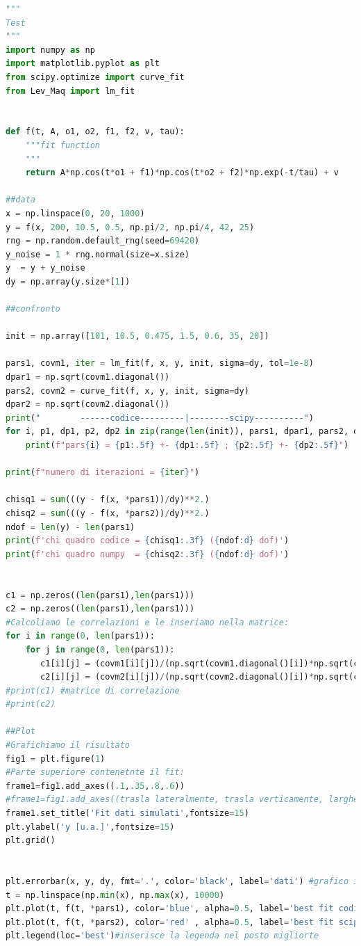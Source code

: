 \documentclass[10pt,a4paper]{article}
\begin{document}
\begin{lstlisting}[language=Python]
"""
Test
"""
import numpy as np
import matplotlib.pyplot as plt
from scipy.optimize import curve_fit
from Lev_Maq import lm_fit


def f(t, A, o1, o2, f1, f2, v, tau):
    """fit function
    """
    return A*np.cos(t*o1 + f1)*np.cos(t*o2 + f2)*np.exp(-t/tau) + v

##data
x = np.linspace(0, 20, 1000)
y = f(x, 200, 10.5, 0.5, np.pi/2, np.pi/4, 42, 25)
rng = np.random.default_rng(seed=69420)
y_noise = 1 * rng.normal(size=x.size)
y  = y + y_noise
dy = np.array(y.size*[1])

##confronto

init = np.array([101, 10.5, 0.475, 1.5, 0.6, 35, 20])

pars1, covm1, iter = lm_fit(f, x, y, init, sigma=dy, tol=1e-8)
dpar1 = np.sqrt(covm1.diagonal())
pars2, covm2 = curve_fit(f, x, y, init, sigma=dy)
dpar2 = np.sqrt(covm2.diagonal())
print("        ------codice---------|--------scipy----------")
for i, p1, dp1, p2, dp2 in zip(range(len(init)), pars1, dpar1, pars2, dpar2):
    print(f"pars{i} = {p1:.5f} +- {dp1:.5f} ; {p2:.5f} +- {dp2:.5f}")

print(f"numero di iterazioni = {iter}")

chisq1 = sum(((y - f(x, *pars1))/dy)**2.)
chisq2 = sum(((y - f(x, *pars2))/dy)**2.)
ndof = len(y) - len(pars1)
print(f'chi quadro codice = {chisq1:.3f} ({ndof:d} dof)')
print(f'chi quadro numpy  = {chisq2:.3f} ({ndof:d} dof)')


c1 = np.zeros((len(pars1),len(pars1)))
c2 = np.zeros((len(pars1),len(pars1)))
#Calcoliamo le correlazioni e le inseriamo nella matrice:
for i in range(0, len(pars1)):
    for j in range(0, len(pars1)):
       c1[i][j] = (covm1[i][j])/(np.sqrt(covm1.diagonal()[i])*np.sqrt(covm1.diagonal()[j]))
       c2[i][j] = (covm2[i][j])/(np.sqrt(covm2.diagonal()[i])*np.sqrt(covm2.diagonal()[j]))
#print(c1) #matrice di correlazione
#print(c2)

##Plot
#Grafichiamo il risultato
fig1 = plt.figure(1)
#Parte superiore contenetnte il fit:
frame1=fig1.add_axes((.1,.35,.8,.6))
#frame1=fig1.add_axes((trasla lateralmente, trasla verticamente, larghezza, altezza))
frame1.set_title('Fit dati simulati',fontsize=15)
plt.ylabel('y [u.a.]',fontsize=15)
plt.grid()


plt.errorbar(x, y, dy, fmt='.', color='black', label='dati') #grafico i punti
t = np.linspace(np.min(x), np.max(x), 10000)
plt.plot(t, f(t, *pars1), color='blue', alpha=0.5, label='best fit codice') #grafico del best fit
plt.plot(t, f(t, *pars2), color='red' , alpha=0.5, label='best fit scipy') #grafico del best fit scipy
plt.legend(loc='best')#inserisce la legenda nel posto migliorte


\end{lstlisting}
\end{document}
